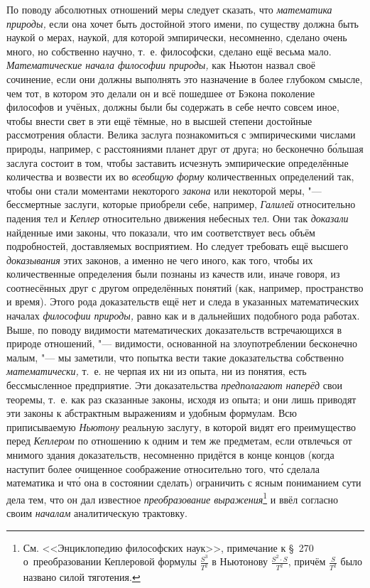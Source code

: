 По поводу абсолютных отношений меры следует сказать, что
{\em математика природы,} если она хочет быть достойной этого имени, по
существу должна быть наукой о мерах, наукой, для которой эмпирически,
несомненно, сделано очень много, но собственно научно, т.~е. философски,
сделано ещё весьма мало. {\em Математические начала философии природы,} как
Ньютон назвал своё сочинение, если они должны выполнять это назначение в более
глубоком смысле, чем тот, в котором это делали он и всё пошедшее от Бэкона
поколение философов и учёных, должны были бы содержать в себе нечто совсем
иное, чтобы внести свет в эти ещё тёмные, но в высшей степени достойные
рассмотрения области. Велика заслуга познакомиться с эмпирическими числами
природы, например, с расстояниями планет друг от друга; но бесконечно
б\'{о}льшая заслуга состоит в том, чтобы заставить исчезнуть эмпирические
определённые количества и возвести их во {\em всеобщую форму} количественных
определений так, чтобы они стали моментами некоторого {\em закона} или
некоторой меры, "--- бессмертные заслуги, которые приобрели себе, например,
{\em Галилей} относительно падения тел и {\em Кеплер} относительно движения
небесных тел. Они так {\em доказали} найденные ими законы, что показали, что им
соответствует весь объём подробностей, доставляемых восприятием. Но следует
требовать ещё высшего {\em доказывания} этих законов, а именно не чего иного,
как того, чтобы их количественные определения были познаны из качеств или,
иначе говоря, из соотнесённых друг с другом определённых понятий (как,
например, пространство и время). Этого рода доказательств ещё нет и следа в
указанных математических началах {\em философии природы,} равно как и в
дальнейших подобного рода работах. Выше, по поводу видимости математических
доказательств встречающихся в природе отношений, "--- видимости, основанной на
злоупотреблении бесконечно малым, "--- мы заметили, что попытка вести такие
доказательства собственно {\em математически,} т.~е. не черпая их ни из опыта,
ни из понятия, есть бессмысленное предприятие. Эти доказательства
{\em предполагают наперёд} свои теоремы, т.~е. как раз сказанные законы, исходя
из опыта; и они лишь приводят эти законы к абстрактным выражениям и удобным
формулам. Всю приписываемую {\em Ньютону} реальную заслугу, в которой видят его
преимущество перед {\em Кеплером} по отношению к одним и тем же предметам, если
отвлечься от мнимого здания доказательств, несомненно придётся в конце концов
(когда наступит более очищенное соображение относительно того, чт\'{о} сделала
математика и чт\'{о} она в состоянии сделать) ограничить с ясным пониманием
сути дела тем, что он дал известное {\em преобразование выражения}\footnote{См.
<<Энциклопедию философских наук>>, примечание к \S~270 о~преобразовании
Кеплеровой формулы $\frac{S^3}{T^2}$ в Ньютонову $\frac{S^2\cdot S}{T^2}$,
причём $\frac{S}{T^2}$ было названо силой тяготения.} и ввёл согласно своим
{\em началам} аналитическую трактовку.

